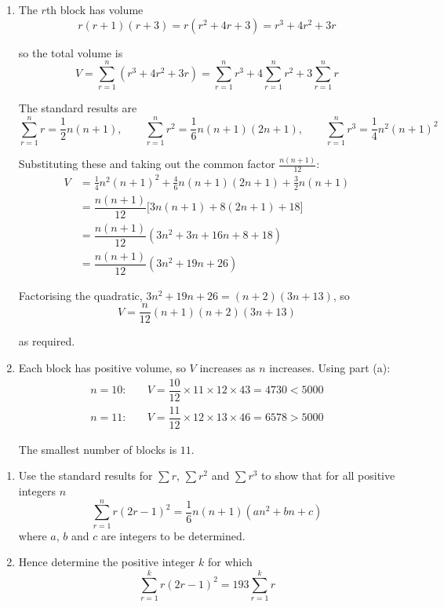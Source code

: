 \documentclass[leqno]{article}
\begin{document}
\begin{enumerate}[
  label=\textbf{\arabic*.},
  leftmargin=*,
  topsep=0pt,
  partopsep=0pt,
  parsep=0pt
]
\vspace*{10pt}

\begin{djsSolution}
\begin{enumerate}[label=\textbf{(\alph*)}, start=1]
  \item The \(r\)th block has volume
\[
r(r+1)(r+3)=r\left(r^2+4r+3\right)=r^3+4r^2+3r
\]

so the total volume is
\[
V=\sum_{r=1}^{n}\left(r^3+4r^2+3r\right)=\sum_{r=1}^{n}r^3+4\sum_{r=1}^{n}r^2+3\sum_{r=1}^{n}r
\]

The standard results are
\[
\sum_{r=1}^{n} r=\frac12 n(n+1),\qquad \sum_{r=1}^{n} r^2=\frac16 n(n+1)(2n+1),\qquad \sum_{r=1}^{n} r^3=\frac14 n^2(n+1)^2
\]

Substituting these and taking out the common factor \(\frac{n(n+1)}{12}\):
\begin{align*}
V&=\frac14 n^2(n+1)^2+\frac46 n(n+1)(2n+1)+\frac32 n(n+1)\\
&=\dfrac{n(n+1)}{12}\Big[3n(n+1)+8(2n+1)+18\Big]\\
&=\dfrac{n(n+1)}{12}\left(3n^2+3n+16n+8+18\right)\\
&=\dfrac{n(n+1)}{12}\left(3n^2+19n+26\right)
\end{align*}

Factorising the quadratic, \(3n^2+19n+26=(n+2)(3n+13)\), so
\[
V=\dfrac{n}{12}(n+1)(n+2)(3n+13)
\]

as required.

  \item Each block has positive volume, so \(V\) increases as \(n\) increases. Using part (a):
\begin{align*}
n=10:&\quad V=\dfrac{10}{12}\times 11\times 12\times 43=4730<5000\\
n=11:&\quad V=\dfrac{11}{12}\times 12\times 13\times 46=6578>5000
\end{align*}

The smallest number of blocks is \(11\).
\end{enumerate}
\end{djsSolution}

\newpage

\questionitem

\begin{enumerate}[label=\textbf{(\alph*)}]
  \item Use the standard results for $\sum r$, $\sum r^2$ and $\sum r^3$ to show that for all positive integers $n$
  \[\sum_{r=1}^{n} r(2r-1)^2 = \dfrac{1}{6}n(n+1)(an^2+bn+c)\]
  where $a$, $b$ and $c$ are integers to be determined.  \\
  \item Hence determine the positive integer $k$ for which
  \[\sum_{r=1}^{k} r(2r-1)^2 = 193\sum_{r=1}^{k} r\] 
\end{enumerate}


\end{enumerate}
\end{document}
